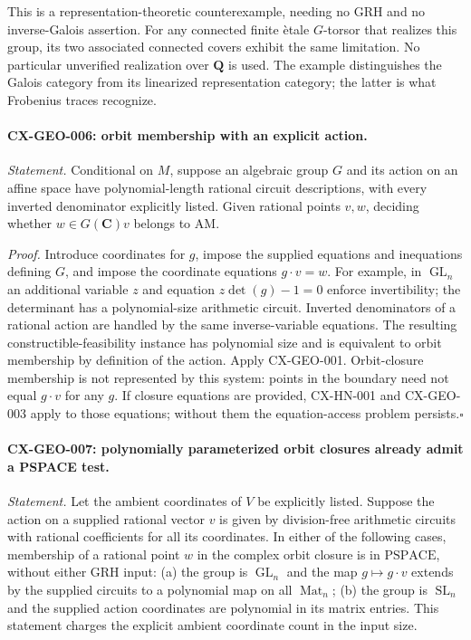 \documentclass[11pt,a4paper]{article}
\begin{document}
This is a representation-theoretic counterexample, needing no GRH and no
inverse-Galois assertion. For any connected finite \`etale $G$-torsor that
realizes this group, its two associated connected covers exhibit the same
limitation. No particular unverified realization over $\mathbf Q$ is used.
The example distinguishes the Galois category from its linearized
representation category; the latter is what Frobenius traces recognize.

\paragraph{CX-GEO-006: orbit membership with an explicit action.}
\emph{Statement.} Conditional on $M$, suppose an algebraic group $G$ and its
action on an affine space have polynomial-length rational circuit descriptions,
with every inverted denominator explicitly listed. Given rational points
$v,w$, deciding whether $w\in G(\mathbf C)v$ belongs to $\mathrm{AM}$.

\emph{Proof.} Introduce coordinates for $g$, impose the supplied equations
and inequations defining $G$, and impose the coordinate equations
$g\cdot v=w$. For example, in $\operatorname{GL}_n$ an additional variable
$z$ and equation $z\det(g)-1=0$ enforce invertibility; the determinant has
a polynomial-size arithmetic circuit. Inverted denominators of a rational
action are handled by the same inverse-variable equations. The resulting
constructible-feasibility instance has polynomial size and is equivalent to
orbit membership by definition of the action. Apply CX-GEO-001.
Orbit-closure membership is not represented by this system: points in the
boundary need not equal $g\cdot v$ for any $g$. If closure equations are
provided, CX-HN-001 and CX-GEO-003 apply to those equations; without them
the equation-access problem persists.\hfill$\square$

\paragraph{CX-GEO-007: polynomially parameterized orbit closures already admit a PSPACE test.}
\emph{Statement.} Let the ambient coordinates of $V$ be explicitly listed.
Suppose the action on a supplied rational vector $v$ is given by
division-free arithmetic circuits with rational coefficients for all its
coordinates. In either of the following
cases, membership of a rational point $w$ in the complex orbit closure is
in $\mathrm{PSPACE}$, without either GRH input: (a) the group is
$\operatorname{GL}_n$ and the map $g\mapsto g\cdot v$ extends by the supplied
circuits to a polynomial map on all $\operatorname{Mat}_n$; (b) the group is
$\operatorname{SL}_n$ and the supplied action coordinates are polynomial
in its matrix entries. This statement charges the explicit ambient
coordinate count in the input size.
\end{document}
